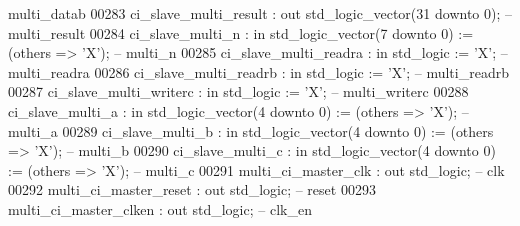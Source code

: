 \begin{DoxyCode}
{       multi\_datab}
00283             ci\_slave\_multi\_result     : \textcolor{keywordflow}{out} \textcolor{comment}{std\_logic\_vector}(\textcolor{vhdllogic}{}\textcolor{vhdllogic}{31} \textcolor{keywordflow}{downto} \textcolor{vhdllogic}{}\textcolor{vhdllogic}{0});                    \textcolor{keyword}{--
       multi\_result}
00284             ci\_slave\_multi\_n          : \textcolor{keywordflow}{in}  \textcolor{comment}{std\_logic\_vector}(\textcolor{vhdllogic}{}\textcolor{vhdllogic}{7} \textcolor{keywordflow}{downto} \textcolor{vhdllogic}{}\textcolor{vhdllogic}{0})  := (\textcolor{keywordflow}{others} => 'X'); \textcolor{keyword}{-- multi\_n}
00285             ci\_slave\_multi\_readra     : \textcolor{keywordflow}{in}  \textcolor{comment}{std\_logic}                     := 'X';             \textcolor{keyword}{--
       multi\_readra}
00286             ci\_slave\_multi\_readrb     : \textcolor{keywordflow}{in}  \textcolor{comment}{std\_logic}                     := 'X';             \textcolor{keyword}{--
       multi\_readrb}
00287             ci\_slave\_multi\_writerc    : \textcolor{keywordflow}{in}  \textcolor{comment}{std\_logic}                     := 'X';             \textcolor{keyword}{--
       multi\_writerc}
00288             ci\_slave\_multi\_a          : \textcolor{keywordflow}{in}  \textcolor{comment}{std\_logic\_vector}(\textcolor{vhdllogic}{}\textcolor{vhdllogic}{4} \textcolor{keywordflow}{downto} \textcolor{vhdllogic}{}\textcolor{vhdllogic}{0})  := (\textcolor{keywordflow}{others} => 'X'); \textcolor{keyword}{-- multi\_a}
00289             ci\_slave\_multi\_b          : \textcolor{keywordflow}{in}  \textcolor{comment}{std\_logic\_vector}(\textcolor{vhdllogic}{}\textcolor{vhdllogic}{4} \textcolor{keywordflow}{downto} \textcolor{vhdllogic}{}\textcolor{vhdllogic}{0})  := (\textcolor{keywordflow}{others} => 'X'); \textcolor{keyword}{-- multi\_b}
00290             ci\_slave\_multi\_c          : \textcolor{keywordflow}{in}  \textcolor{comment}{std\_logic\_vector}(\textcolor{vhdllogic}{}\textcolor{vhdllogic}{4} \textcolor{keywordflow}{downto} \textcolor{vhdllogic}{}\textcolor{vhdllogic}{0})  := (\textcolor{keywordflow}{others} => 'X'); \textcolor{keyword}{-- multi\_c}
00291             multi\_ci\_master\_clk       : \textcolor{keywordflow}{out} \textcolor{comment}{std\_logic};                                        \textcolor{keyword}{-- clk}
00292             multi\_ci\_master\_reset     : \textcolor{keywordflow}{out} \textcolor{comment}{std\_logic};                                        \textcolor{keyword}{-- reset}
00293             multi\_ci\_master\_clken     : \textcolor{keywordflow}{out} \textcolor{comment}{std\_logic};                                        \textcolor{keyword}{-- clk\_en}

\end{DoxyCode}
